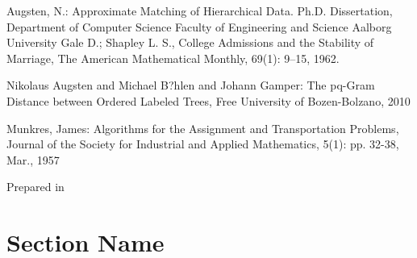 \documentclass[a4paper,11pt]{article}
\begin{document}
\begin{thebibliography}{9999}
Augsten, N.: Approximate Matching of Hierarchical Data. 
Ph.D. Dissertation, Department of Computer Science Faculty of Engineering and Science Aalborg University
Gale D.; Shapley L. S., College Admissions and the Stability of Marriage, The American Mathematical Monthly,  69(1): 9–15, 1962.

Nikolaus Augsten and Michael B?hlen and Johann Gamper: The pq-Gram Distance between Ordered Labeled Trees, Free University of Bozen-Bolzano, 2010 

Munkres, James: Algorithms for the Assignment and Transportation Problems, Journal of the Society for Industrial and Applied Mathematics, 5(1): pp. 32-38, Mar., 1957

\end{thebibliography}
\vfill
\begin{flushright}\small Prepared in \LaTeXe\ \end{flushright}

\appendix
\section{Section Name}
\end{document}

